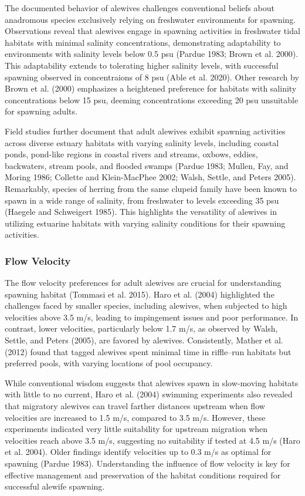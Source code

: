 \documentclass[
]{book}
\begin{document}
The documented behavior of alewives challenges conventional beliefs about anadromous species exclusively relying on freshwater environments for spawning. Observations reveal that alewives engage in spawning activities in freshwater tidal habitats with minimal salinity concentrations, demonstrating adaptability to environments with salinity levels below 0.5 psu (Pardue 1983; Brown et al. 2000). This adaptability extends to tolerating higher salinity levels, with successful spawning observed in concentraions of 8 psu (Able et al. 2020). Other research by Brown et al. (2000) emphasizes a heightened preference for habitats with salinity concentrations below 15 psu, deeming concentrations exceeding 20 psu unsuitable for spawning adults.

Field studies further document that adult alewives exhibit spawning activities across diverse estuary habitats with varying salinity levels, including coastal ponds, pond-like regions in coastal rivers and streams, oxbows, eddies, backwaters, stream pools, and flooded swamps (Pardue 1983; Mullen, Fay, and Moring 1986; Collette and Klein-MacPhee 2002; Walsh, Settle, and Peters 2005). Remarkably, species of herring from the same clupeid family have been known to spawn in a wide range of salinity, from freshwater to levels exceeding 35 psu (Haegele and Schweigert 1985). This highlights the versatility of alewives in utilizing estuarine habitats with varying salinity conditions for their spawning activities.

\hypertarget{flow-velocity}{%
\subsubsection{Flow Velocity}\label{flow-velocity}}

The flow velocity preferences for adult alewives are crucial for understanding spawning habitat (Tommasi et al. 2015). Haro et al. (2004) highlighted the challenges faced by smaller species, including alewives, when subjected to high velocities above 3.5 m/s, leading to impingement issues and poor performance. In contrast, lower velocities, particularly below 1.7 m/s, as observed by Walsh, Settle, and Peters (2005), are favored by alewives. Consistently, Mather et al. (2012) found that tagged alewives spent minimal time in riffle--run habitats but preferred pools, with varying locations of pool occupancy.

While conventional wisdom suggests that alewives spawn in slow-moving habitats with little to no current, Haro et al. (2004) swimming experiments also revealed that migratory alewives can travel farther distances upstream when flow velocities are increased to 1.5 m/s, compared to 3.5 m/s. However, these experiments indicated very little suitability for upstream migration when velocities reach above 3.5 m/s, suggesting no suitability if tested at 4.5 m/s (Haro et al. 2004). Older findings identify velocities up to 0.3 m/s as optimal for spawning (Pardue 1983). Understanding the influence of flow velocity is key for effective management and preservation of the habitat conditions required for successful alewife spawning.
\end{document}
